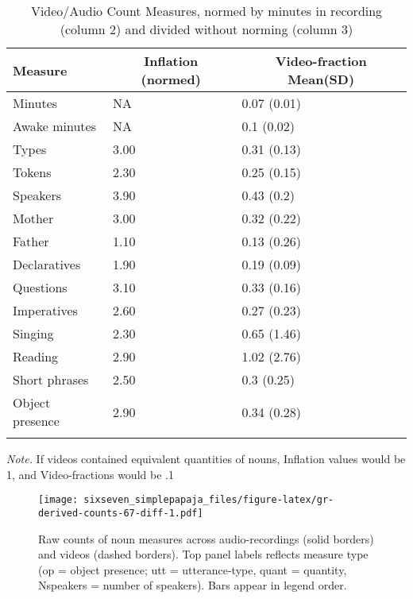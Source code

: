 \documentclass[man]{apa6}
\theoremstyle{definition}
\theoremstyle{definition}
\theoremstyle{definition}
\theoremstyle{remark}
\begin{document}
\begin{table}[tbp]
\begin{center}
\begin{threeparttable}
\caption{\label{tab:normtable}Video/Audio Count Measures, normed by minutes in recording (column 2) and divided without norming (column 3)}
\small{
\begin{tabular}{lll}
\toprule
Measure & \multicolumn{1}{c}{Inflation (normed)} & \multicolumn{1}{c}{Video-fraction Mean(SD)}\\
\midrule
Minutes & NA & 0.07 (0.01)\\
Awake minutes & NA & 0.1 (0.02)\\
Types & 3.00 & 0.31 (0.13)\\
Tokens & 2.30 & 0.25 (0.15)\\
Speakers & 3.90 & 0.43 (0.2)\\
Mother & 3.00 & 0.32 (0.22)\\
Father & 1.10 & 0.13 (0.26)\\
Declaratives & 1.90 & 0.19 (0.09)\\
Questions & 3.10 & 0.33 (0.16)\\
Imperatives & 2.60 & 0.27 (0.23)\\
Singing & 2.30 & 0.65 (1.46)\\
Reading & 2.90 & 1.02 (2.76)\\
Short phrases & 2.50 & 0.3 (0.25)\\
Object presence & 2.90 & 0.34 (0.28)\\
\bottomrule
\addlinespace
\end{tabular}
}
\begin{tablenotes}[para]
\textit{Note.} If videos contained equivalent quantities of nouns, Inflation values would be 1, and Video-fractions would be .1
\end{tablenotes}
\end{threeparttable}
\end{center}
\end{table}

\begin{figure}
\centering
\texttt{[image: sixseven\_simplepapaja\_files/figure-latex/gr-derived-counts-67-diff-1.pdf]}
\caption{\label{fig:gr-derived-counts-67-diff}Raw counts of noun measures
across audio-recordings (solid borders) and videos (dashed borders). Top
panel labels reflects measure type (op = object presence; utt =
utterance-type, quant = quantity, Nspeakers = number of speakers). Bars
appear in legend order.}
\end{figure}
\end{document}
